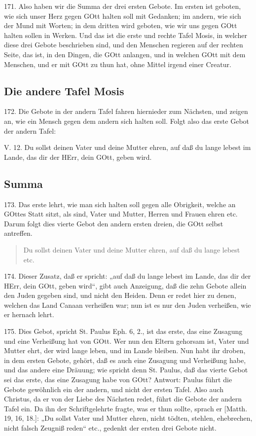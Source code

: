 171. Also haben wir die Summa der drei ersten Gebote. Im ersten ist geboten, wie sich unser Herz gegen GOtt halten soll mit Gedanken; im andern, wie sich der Mund mit Worten; in dem dritten wird geboten, wie wir uns gegen GOtt halten sollen in Werken. Und das ist die erste und rechte Tafel Mosis, in welcher diese drei Gebote beschrieben sind, und den Menschen regieren auf der rechten Seite, das ist, in den Dingen, die GOtt anlangen, und in welchen GOtt mit dem Menschen, und er mit GOtt zu thun hat, ohne Mittel irgend einer Creatur.

\subsection{Die andere Tafel Mosis}

172. Die Gebote in der andern Tafel fahren hiernieder zum Nächsten, und zeigen an, wie ein Mensch gegen dem andern sich halten soll. Folgt also das erste Gebot der andern Tafel:

\begin{schriftzitat}
V. 12. Du sollst deinen Vater und deine Mutter ehren, auf daß du lange lebest im Lande, das dir der HErr, dein GOtt, geben wird.
\end{schriftzitat}

\subsection{Summa}

173. Das erste lehrt, wie man sich halten soll gegen alle Obrigkeit, welche an GOttes Statt sitzt, als sind, Vater und Mutter, Herren und Frauen ehren etc. Darum folgt dies vierte Gebot den andern ersten dreien, die GOtt selbst antreffen.

\begin{quote}
Du sollst deinen Vater und deine Mutter ehren, auf daß du lange lebest etc.
\end{quote}

174. Dieser Zusatz, daß er spricht: „auf daß du lange lebest im Lande, das dir der HErr, dein GOtt, geben wird“, gibt auch Anzeigung, daß die zehn Gebote allein den Juden gegeben sind, und nicht den Heiden. Denn er redet hier zu denen, welchen das Land Canaan verheißen war; nun ist es nur den Juden verheißen, wie er hernach lehrt.

175. Dies Gebot, spricht St. Paulus Eph. 6, 2., ist das erste, das eine Zusagung und eine Verheißung hat von GOtt. Wer nun den Eltern gehorsam ist, Vater und Mutter ehrt, der wird lange leben, und im Lande bleiben. Nun habt ihr droben, in dem ersten Gebote, gehört, daß es auch eine Zusagung und Verheißung habe, und das andere eine Dräuung; wie spricht denn St. Paulus, daß das vierte Gebot sei das erste, das eine Zusagung habe von GOtt? Antwort: Paulus führt die Gebote gewöhnlich ein der andern, und nicht der ersten Tafel. Also auch Christus, da er von der Liebe des Nächsten redet, führt die Gebote der andern Tafel ein. Da ihn der Schriftgelehrte fragte, was er thun sollte, sprach er [Matth. 19, 16, 18.]: „Du sollst Vater und Mutter ehren, nicht tödten, stehlen, ehebrechen, nicht falsch Zeugniß reden“ etc., gedenkt der ersten drei Gebote nicht.

